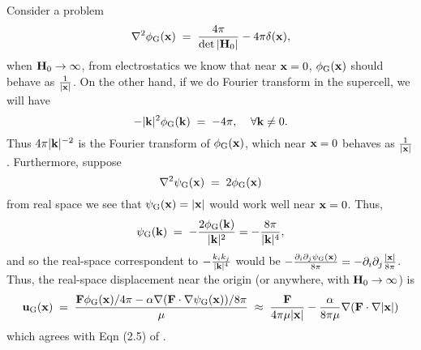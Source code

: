 \documentclass[12pt]{article}
\begin{document}
Consider a problem
\begin{equation}
  \nabla^2 \phi_{\rm G}({\bf x}) \;=\; 
  \frac{4\pi}{\det|{\bf H}_0|} - 4\pi\delta({\bf x}),
\end{equation}
when ${\bf H}_0\rightarrow\infty$, from electrostatics we know
that near ${\bf x}=0$, $\phi_{\rm G}({\bf x})$ should behave as
$\frac{1}{|{\bf x}|}$.  On the other hand, if we do Fourier
transform in the supercell, we will have
\begin{equation}
 -|{\bf k}|^2 \phi_{\rm G}({\bf k}) \;=\; -4\pi, \;\;\;\;\forall {\bf k}\neq 0.
\end{equation}
Thus $4\pi|{\bf k}|^{-2}$ is the Fourier transform of $\phi_{\rm G}({\bf
x})$, which near ${\bf x}=0$ behaves as $\frac{1}{|{\bf x}|}$.
Furthermore, suppose
\begin{equation}
  \nabla^2 \psi_{\rm G}({\bf x}) \;=\;  2\phi_{\rm G}({\bf x})
\end{equation}
from real space we see that $\psi_{\rm G}({\bf x})=|{\bf x}|$ 
would work well near ${\bf x}=0$.  Thus,
\begin{equation}
 \psi_{\rm G}({\bf k}) \;=\; -\frac{2\phi_{\rm G}({\bf k})}{|{\bf k}|^2}
 = -\frac{8\pi}{|{\bf k}|^4},
\end{equation}
and so the real-space correspondent to $-\frac{k_ik_j}{|{\bf k}|^4}$
would be $-\frac{\partial_i\partial_j\psi_{\rm G}({\bf x})}{8\pi} =
-\partial_i\partial_j \frac{|{\bf x}|}{8\pi}$.  Thus, the real-space
displacement near the origin (or anywhere, with ${\bf
H}_0\rightarrow\infty$) is
\begin{equation}
 {\bf u}_{\rm G}({\bf x}) \;=\; \frac{{\bf F}\phi_{\rm G}({\bf
 x})/4\pi-\alpha\nabla({\bf F}\cdot\nabla\psi_{\rm G}({\bf x}))/8\pi}{\mu} 
 \;\approx\; \frac{{\bf
 F}}{4\pi\mu|{\bf x}|} - \frac{\alpha}{8\pi\mu}\nabla({\bf F}\cdot
 \nabla|{\bf x}|)
\end{equation}
which agrees with Eqn (2.5) of \cite{Eshelby57}.
\end{document}
